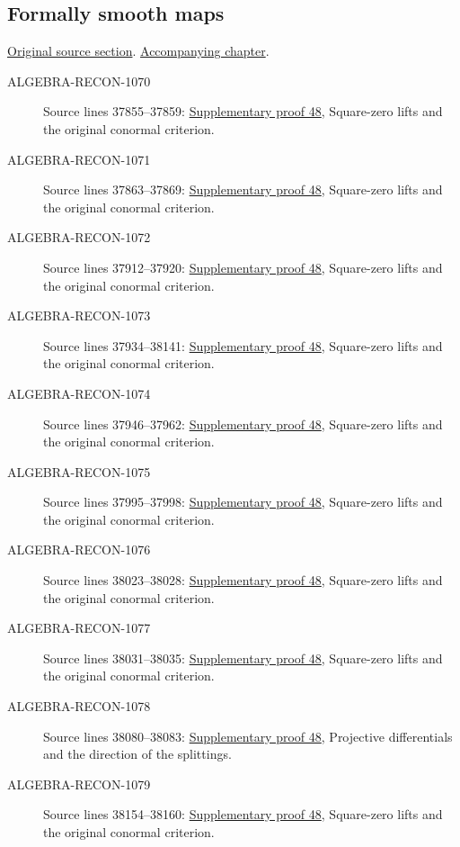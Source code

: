\subsection{Formally smooth maps}
\hypertarget{algebra-source-section-formally-smooth}{}
\noindent\href{https://github.com/stacks/stacks-project/blob/a04446e57ec1fbc252a871afcec7752fb2807b14/algebra.tex\#L37795}{Original source section}. \href{algebra.pdf\#nameddest=section-formally-smooth}{Accompanying chapter}.

\begin{description}
\item[ALGEBRA-RECON-1070] Source lines 37855--37859: \hyperlink{algebra_formal_smooth_notes_20260928}{Supplementary proof 48}, Square-zero lifts and the original conormal criterion.
\item[ALGEBRA-RECON-1071] Source lines 37863--37869: \hyperlink{algebra_formal_smooth_notes_20260928}{Supplementary proof 48}, Square-zero lifts and the original conormal criterion.
\item[ALGEBRA-RECON-1072] Source lines 37912--37920: \hyperlink{algebra_formal_smooth_notes_20260928}{Supplementary proof 48}, Square-zero lifts and the original conormal criterion.
\item[ALGEBRA-RECON-1073] Source lines 37934--38141: \hyperlink{algebra_formal_smooth_notes_20260928}{Supplementary proof 48}, Square-zero lifts and the original conormal criterion.
\item[ALGEBRA-RECON-1074] Source lines 37946--37962: \hyperlink{algebra_formal_smooth_notes_20260928}{Supplementary proof 48}, Square-zero lifts and the original conormal criterion.
\item[ALGEBRA-RECON-1075] Source lines 37995--37998: \hyperlink{algebra_formal_smooth_notes_20260928}{Supplementary proof 48}, Square-zero lifts and the original conormal criterion.
\item[ALGEBRA-RECON-1076] Source lines 38023--38028: \hyperlink{algebra_formal_smooth_notes_20260928}{Supplementary proof 48}, Square-zero lifts and the original conormal criterion.
\item[ALGEBRA-RECON-1077] Source lines 38031--38035: \hyperlink{algebra_formal_smooth_notes_20260928}{Supplementary proof 48}, Square-zero lifts and the original conormal criterion.
\item[ALGEBRA-RECON-1078] Source lines 38080--38083: \hyperlink{algebra_formal_smooth_notes_20260928}{Supplementary proof 48}, Projective differentials and the direction of the splittings.
\item[ALGEBRA-RECON-1079] Source lines 38154--38160: \hyperlink{algebra_formal_smooth_notes_20260928}{Supplementary proof 48}, Square-zero lifts and the original conormal criterion.

\end{description}
